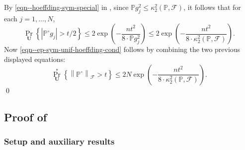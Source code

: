 By \eqref{eqn--hoeffding-sym-special} in ,
since \(\mathbb{P} g_{j}^{2} \leq \kappa_{2}^{2} (\mathbb{P}, \mathcal{F})\), it
follows that for each \(j = 1, \dots, N\),
\begin{equation*}
  \Pr_{\mathbf{U}} \left\{ \left| \mathbb{P}^{\circ} g_{j} \right| > t / 2
  \right\} \leq 2 \exp \left( - \frac{n t^{2}}{8 \cdot \mathbb{P} g_{j}^{2}}
  \right) \leq 2 \exp \left( - \frac{n t^{2}}{8 \cdot \kappa_{2}^{2}
  (\mathbb{P}, \mathcal{F})} \right).
\end{equation*}
Now \eqref{eqn--ep-sym-unif-hoeffding-cond} follows by combining the two
previous displayed equations:
\begin{equation*}
  \Pr_{\mathbf{U}}^{\ast} \left\{ \left\| \mathbb{P}^{\circ}
  \right\|_{\mathcal{F}} > t \right\} \leq
  2 N \exp \left( - \frac{n t^{2}}{8 \cdot \kappa_{2}^{2} (\mathbb{P},
  \mathcal{F})} \right).
\end{equation*}
\qed

\subsection{Proof of
\texorpdfstring{}{Lemma
\ref{lem--sqrt-ep-2nd-moment-sup-pbound}}}
\label{sec--prf--lem--sqrt-ep-2nd-moment-sup-pbound}

\subsubsection{Setup and auxiliary results}

